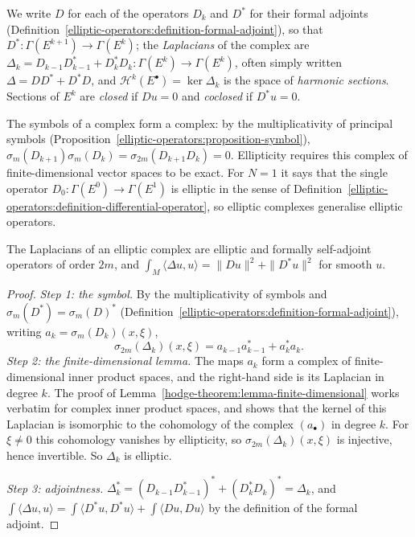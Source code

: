 \begin{notation}\label{hodge-theorem:notation-elliptic-complex}
We write $D$ for each of the operators $D_k$ and $D^*$ for their formal adjoints (Definition~\ref{elliptic-operators:definition-formal-adjoint}), so that $D^* \colon \Gamma(E^{k+1}) \to \Gamma(E^k)$; the
\emph{Laplacians} of the complex are $\Delta_k = D_{k-1}D_{k-1}^* + D_k^*D_k \colon \Gamma(E^k) \to \Gamma(E^k)$, often simply written $\Delta = DD^* + D^*D$, and
$\mathcal{H}^k(E^\bullet) = \ker\Delta_k$ is the space of \emph{harmonic sections}. Sections of $E^k$ are \emph{closed} if $Du = 0$ and \emph{coclosed} if $D^*u = 0$.
\end{notation}

The symbols of a complex form a complex: by the multiplicativity of principal symbols (Proposition~\ref{elliptic-operators:proposition-symbol}), $\sigma_m(D_{k+1})\sigma_m(D_k) = \sigma_{2m}(D_{k+1}D_k) = 0$.
Ellipticity requires this complex of finite-dimensional vector spaces to be exact. For $N = 1$ it says that the single operator $D_0 \colon \Gamma(E^0) \to \Gamma(E^1)$ is elliptic in the sense of
Definition~\ref{elliptic-operators:definition-differential-operator}, so elliptic complexes generalise elliptic operators.

\begin{lemma}\label{hodge-theorem:lemma-laplacian-elliptic-complex}
The Laplacians of an elliptic complex are elliptic and formally self-adjoint operators of order $2m$, and $\int_M\langle\Delta u, u\rangle = \|Du\|^2 + \|D^*u\|^2$ for smooth $u$.
\end{lemma}

\begin{proof}
\emph{Step 1: the symbol.} By the multiplicativity of symbols and $\sigma_m(D^*) = \sigma_m(D)^*$ (Definition~\ref{elliptic-operators:definition-formal-adjoint}), writing $a_k = \sigma_m(D_k)(x, \xi)$,
\[
\sigma_{2m}(\Delta_k)(x, \xi) = a_{k-1}a_{k-1}^* + a_k^*a_k .
\]
\emph{Step 2: the finite-dimensional lemma.} The maps $a_k$ form a complex of finite-dimensional inner product spaces, and the right-hand side is its Laplacian in degree $k$. The proof of
Lemma~\ref{hodge-theorem:lemma-finite-dimensional} works verbatim for complex inner product spaces, and shows that the kernel of this Laplacian is isomorphic to the cohomology of the complex
$(a_\bullet)$ in degree $k$. For $\xi \neq 0$ this cohomology vanishes by ellipticity, so $\sigma_{2m}(\Delta_k)(x, \xi)$ is injective, hence invertible. So $\Delta_k$ is elliptic.

\emph{Step 3: adjointness.} $\Delta_k^* = (D_{k-1}D_{k-1}^*)^* + (D_k^*D_k)^* = \Delta_k$, and $\int\langle\Delta u, u\rangle = \int\langle D^*u, D^*u\rangle + \int\langle Du, Du\rangle$ by the definition of the formal adjoint.
\end{proof}

